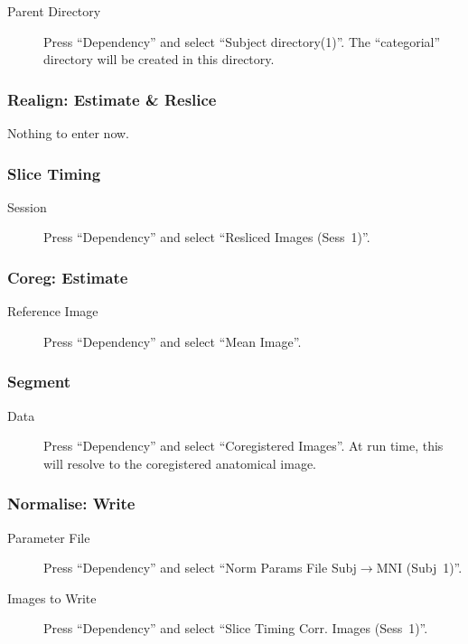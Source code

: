 \documentclass[a4paper]{book}
\begin{document}
\begin{description}
\item[Parent Directory] Press ``Dependency'' and select ``Subject
  directory(1)''. The ``categorial'' directory will be created in this
  directory. 
\end{description}

\subsubsection*{Realign: Estimate \& Reslice}

Nothing to enter now.

\subsubsection*{Slice Timing}

\begin{description}
\item[Session] Press ``Dependency'' and select ``Resliced Images (Sess~1)''.
\end{description}

\subsubsection*{Coreg: Estimate}

\begin{description}
\item[Reference Image] Press ``Dependency'' and select ``Mean Image''.
\end{description}

\subsubsection*{Segment}

\begin{description}
\item[Data] Press ``Dependency'' and select ``Coregistered Images''. At run
  time, this will resolve to the coregistered anatomical image.
\end{description}

\subsubsection*{Normalise: Write}

\begin{description}
\item[Parameter File] Press ``Dependency'' and select ``Norm Params File
  Subj$\rightarrow$MNI (Subj~1)''.
\item[Images to Write] Press ``Dependency'' and select ``Slice Timing
  Corr. Images (Sess~1)''. 
\end{description}
\end{document}
